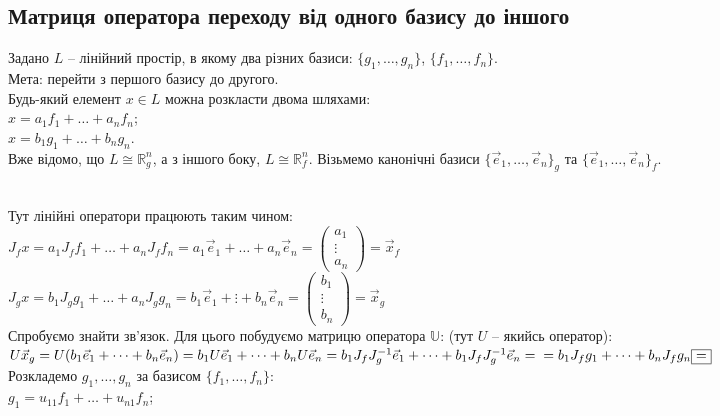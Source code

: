\documentclass[a4paper, 10pt]{article}
\theoremstyle{theoremdd}
\begin{document}
\subsection{Матриця оператора переходу від одного базису до іншого}
Задано $L$ -- лінійний простір, в якому два різних базиси: $\{g_1,
\dots,g_n\}$, $\{f_1,\dots,f_n\}$. \\
Мета: перейти з першого базису до другого.\\
Будь-який елемент $x \in L$ можна розкласти двома шляхами:\\
$x = a_1 f_1 + \dots + a_n f_n$;\\
$x = b_1 g_1 + \dots + b_n g_n$.\\
Вже відомо, що $L \cong \mathbb{R}^n_g$, а з іншого боку, $L \cong \mathbb{R}^n_f$. Візьмемо канонічні базиси $\{\vec{e}_1,\dots, \vec{e}_n\}_g$ та $\{\vec{e}_1,\dots, \vec{e}_n\}_f$.
\\
\\
Тут лінійні оператори працюють таким чином:\\
$J_f x = a_1 J_f f_1 + \dots + a_n J_f f_n = a_1 \vec{e}_1 + \dots + a_n \vec{e}_n = \begin{pmatrix}
a_1 \\ \vdots \\ a_n
\end{pmatrix} = \vec{x}_f$\\
$J_g x = b_1 J_g g_1 + \dots + a_n J_g g_n = b_1 \vec{e}_1 + \vdots + b_n \vec{e}_n = \begin{pmatrix}
b_1 \\ \vdots \\ b_n
\end{pmatrix} = \vec{x}_g $\\
Спробуємо знайти зв'язок. Для цього побудуємо матрицю оператора $\mathbb{U}$: (тут $U$ -- якийсь оператор):\\
$U \vec{x}_g = U(b_1 \vec{e}_1 + \dots + b_n \vec{e}_n) = b_1 U\vec{e}_1 + \dots + b_n U\vec{e}_n = b_1 J_f J_g^{-1} \vec{e}_1 + \dots + b_1 J_f J_g^{-1} \vec{e}_n = \\ = b_1 J_f g_1 + \dots + b_n J_f g_n \boxed{=} $\\
Розкладемо $g_1,\dots,g_n$ за базисом $\{f_1,\dots, f_n\}$:\\
$g_1 = u_{11}f_1 + \dots + u_{n1}f_n$;\\
\end{document}

